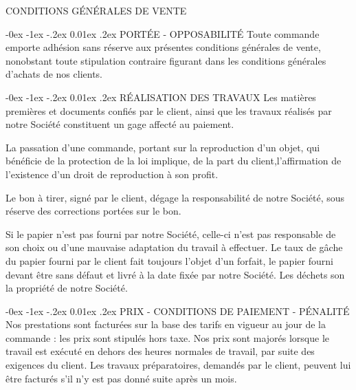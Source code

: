 \documentclass[a4paper, oneside, 10pt, french]{article}
\makeatletter
\renewcommand{\section}{\@startsection {section}{1}{\z@}%
             {-0ex \@plus -1ex \@minus -.2ex}%
             {0.01ex \@plus.2ex}%
             {\normalfont\normalsize\sffamily}}
\makeatother
\begin{document}
\begin{center}
\textcolor{chaumeil-violet}{\textsc{\Large CONDITIONS GÉNÉRALES DE VENTE}}
\end{center}
\begin{multicols}{2}

\begin{small}
\section{PORTÉE - OPPOSABILITÉ}
Toute commande emporte adhésion sans réserve aux présentes conditions générales de vente, nonobstant toute stipulation contraire figurant dans les conditions générales d'achats de nos clients.

\section{RÉALISATION DES TRAVAUX}
Les matières premières et documents confiés par le client, ainsi que les travaux réalisés par notre Société constituent un gage affecté au paiement.

La passation d'une commande, portant sur la reproduction d'un objet, qui bénéficie de la protection de la loi implique, de la part du client,l'affirmation de l'existence d'un droit de reproduction à son profit.

Le bon à tirer, signé par le client, dégage la responsabilité de notre Société, sous réserve des corrections portées sur le bon.

Si le papier n'est pas fourni par notre Société, celle-ci n'est pas responsable de son choix ou d'une mauvaise adaptation du travail à effectuer. Le taux de gâche du papier fourni par le client fait toujours l'objet d'un forfait, le papier fourni devant être sans défaut et livré à la date fixée par notre Société. Les déchets son la propriété de notre Société.

\section{PRIX - CONDITIONS DE PAIEMENT - PÉNALITÉ}
Nos prestations sont facturées sur la base des tarifs en vigueur au jour de la commande : les prix sont stipulés hors taxe. Nos prix sont majorés lorsque le travail est exécuté en dehors des heures normales de travail, par suite des exigences du client. Les travaux préparatoires, demandés par le client, peuvent lui être facturés s'il n'y est pas donné suite après un mois.


\end{small}
\end{multicols}
\end{document}
